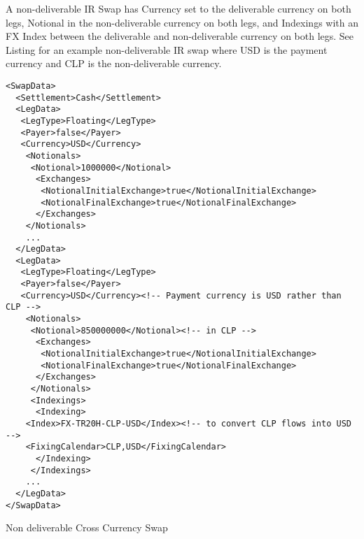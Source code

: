 A non-deliverable IR Swap has Currency set to the deliverable currency on both legs, Notional in the non-deliverable currency on both legs, and Indexings with an FX Index between the deliverable and non-deliverable currency on both legs. See Listing  for an example non-deliverable IR swap where USD is the payment currency and CLP is the non-deliverable currency.

\begin{listing}[H]
\begin{verbatim}
<SwapData>
  <Settlement>Cash</Settlement>
  <LegData>
   <LegType>Floating</LegType>
   <Payer>false</Payer>  
   <Currency>USD</Currency>
    <Notionals>
     <Notional>1000000</Notional>
      <Exchanges>
       <NotionalInitialExchange>true</NotionalInitialExchange>
       <NotionalFinalExchange>true</NotionalFinalExchange>
      </Exchanges>
    </Notionals>
    ...
  </LegData>
  <LegData>
   <LegType>Floating</LegType>
   <Payer>false</Payer>  
   <Currency>USD</Currency><!-- Payment currency is USD rather than CLP -->
    <Notionals>
     <Notional>850000000</Notional><!-- in CLP -->
      <Exchanges>
       <NotionalInitialExchange>true</NotionalInitialExchange>
       <NotionalFinalExchange>true</NotionalFinalExchange>
      </Exchanges>
     </Notionals>
     <Indexings>
      <Indexing>
	<Index>FX-TR20H-CLP-USD</Index><!-- to convert CLP flows into USD -->
	<FixingCalendar>CLP,USD</FixingCalendar>
      </Indexing>
     </Indexings>     
    ...
  </LegData>
</SwapData>
\end{verbatim}
\caption{Non deliverable Cross Currency Swap}
\label{lst:ndir_xccy_swap}
\end{listing}
